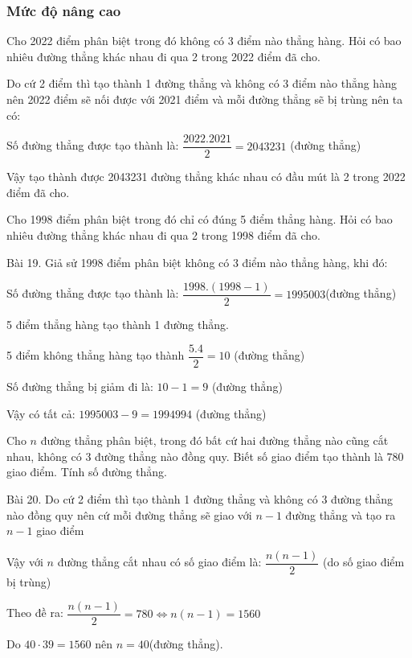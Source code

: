 \subsubsection*{Mức độ nâng cao}
\begin{bt}
	Cho 2022 điểm phân biệt trong đó không có 3 điểm nào thẳng hàng. Hỏi có bao nhiêu đường thẳng khác nhau đi qua 2 trong 2022 điểm đã cho.
	\begin{loigiaichuong28}
		Do cứ 2 điểm thì tạo thành 1 đường thẳng và không có 3 điểm nào thẳng hàng nên 2022 điểm sẽ nối được với 2021 điểm và mỗi đường thẳng sẽ bị trùng nên ta có: 
		
		Số đường thẳng được tạo thành là: $\dfrac{2022.2021}{2}=2043231$ (đường thẳng)
		
		Vậy tạo thành được 2043231 đường thẳng khác nhau có đầu mút là 2 trong 2022 điểm đã cho.
	\end{loigiaichuong28}
\end{bt}
\begin{bt}
	Cho 1998 điểm phân biệt trong đó chỉ có đúng 5 điểm thẳng hàng. Hỏi có bao nhiêu đường thẳng khác nhau đi qua 2 trong 1998 điểm đã cho.
	\begin{loigiaichuong28}
		Bài 19. Giả sử 1998 điểm phân biệt không có 3 điểm nào thẳng hàng, khi đó: 
		
		Số đường thẳng được tạo thành là: $\dfrac{1998.(1998-1)}{2}=1995003$(đường thẳng)
		
		5 điểm thẳng hàng tạo thành 1 đường thẳng.
		
		5 điểm không thẳng hàng tạo thành $\dfrac{5.4}{2}=10$ (đường thẳng)
		
		Số đường thẳng bị giảm đi là: $10-1=9$ (đường thẳng)
		
		Vậy có tất cả: $1995003-9=1994994$ (đường thẳng)
	\end{loigiaichuong28}
\end{bt}
\begin{bt}
	Cho $n$ đường thẳng phân biệt, trong đó bất cứ hai đường thẳng nào cũng cắt nhau, không có 3 đường thẳng nào đồng quy. Biết số giao điểm tạo thành là 780 giao điểm. Tính số đường thẳng.
	\begin{loigiaichuong28}
		Bài 20. Do cứ 2 điểm thì tạo thành 1 đường thẳng và không có 3 đường thẳng nào đồng quy nên cứ mỗi đường thẳng sẽ giao với $n-1$ đường thẳng và tạo ra $n-1$ giao điểm 
		
		Vậy với $n$ đường thẳng cắt nhau có số giao điểm là: $\dfrac{n(n-1)}{2}$ (do số giao điểm bị trùng)
		
		Theo đề ra: $\dfrac{n(n-1)}{2}=780 \Leftrightarrow n(n-1)=1560$
		
		Do $40\cdot39=1560$ nên $n=40$(đường thẳng).
	\end{loigiaichuong28}
\end{bt}
